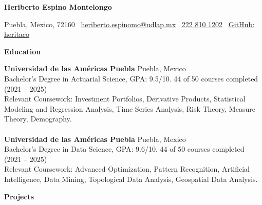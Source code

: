 \documentclass[9pt]{extarticle} %
\begin{document}
{\fontsize{10pt}{12pt}\selectfont
\begin{center}
    \textbf{Heriberto Espino Montelongo}\\
    \vspace{-1ex} %
\end{center}
}

\begin{center}
    Puebla, Mexico, 72160 \textbullet \ 
    \href{mailto:heriberto.espinomo@udlap.mx}{\textcolor{customblue}{\underline{heriberto.espinomo@udlap.mx}}} \textbullet \ 
    \href{tel:+522228101202}{\textcolor{customblue}{\underline{222 810 1202}}} \textbullet \ 
    \href{https://github.com/heritaco}{\textcolor{customblue}{\underline{GitHub: heritaco}}}
\end{center}



\begin{center}
    \vspace{1ex}
    \textbf{Education}
    \vspace{-2ex}
\end{center}

\textbf{Universidad de las Américas Puebla} \hfill Puebla, Mexico\\
Bachelor's Degree in Actuarial Science, GPA: 9.5/10. \hfill  44 of 50 courses completed (2021 -- 2025) \\
Relevant Coursework: Investment Portfolios, Derivative Products, Statistical Modeling and Regression Analysis, Time Series Analysis, Risk Theory, Measure Theory, Demography.\\
\\
\textbf{Universidad de las Américas Puebla} \hfill Puebla, Mexico\\
Bachelor's Degree in Data Science, GPA: 9.6/10. \hfill  44 of 50 courses completed (2021 -- 2025)\\
Relevant Coursework: Advanced Optimization, Pattern Recognition, Artificial Intelligence, Data Mining, Topological Data Analysis, Geospatial Data Analysis.












\begin{center}
    \vspace{1ex}
    \textbf{Projects}
    \vspace{-1ex}
\end{center}
\end{document}
